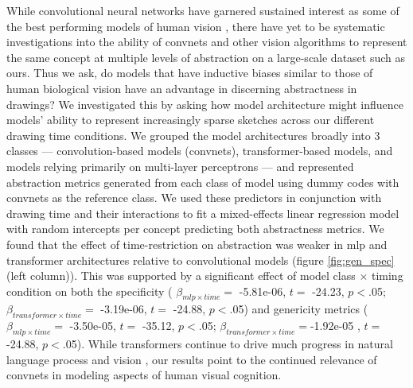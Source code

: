 \documentclass[10pt,letterpaper]{article}
\begin{document}
While convolutional neural networks have garnered sustained interest as some of the best performing models of human vision \cite{yamins2014performance,cadieu2014deep,kriegeskorte2015deep,kietzmann2019recurrence}, there have yet to be systematic investigations into the ability of convnets and other vision algorithms to represent the same concept at multiple levels of abstraction on a large-scale dataset such as ours.
Thus we ask, do models that have inductive biases similar to those of human biological vision have an advantage in discerning abstractness in drawings?
We investigated this by asking how model architecture might influence models' ability to represent increasingly sparse sketches across our different drawing time conditions.
We grouped the model architectures broadly into 3 classes — convolution-based models (convnets), transformer-based models, and models relying primarily on multi-layer perceptrons \cite{tolstikhin2021mlp}— and represented abstraction metrics generated from each class of model using dummy codes with convnets as the reference class. We used these predictors in conjunction with drawing time and their interactions to fit a mixed-effects linear regression model with random intercepts per concept predicting both abstractness metrics.
We found that the effect of time-restriction on abstraction was weaker in mlp and transformer architectures relative to convolutional models (figure \ref{fig:gen_spec} (left column)).
This was supported by a significant effect of model class $\times$ timing condition on both the specificity (
$\beta_{mlp \times time}= $ -5.81e-06, $t =$ -24.23, $p<$.05; $\beta_{transformer \times time}= $ -3.19e-06, $t =$ -24.88, $p<$.05) and genericity metrics (
$\beta_{mlp \times time}= $ -3.50e-05, $t =$ -35.12, $p<$.05; $\beta_{transformer \times time}= $-1.92e-05 , $t =$ -24.88, $p<$.05). While transformers continue to drive much progress in natural language process and vision \cite{chen2021visformer}, our results point to the continued relevance of convnets in modeling aspects of human visual cognition.
\end{document}
